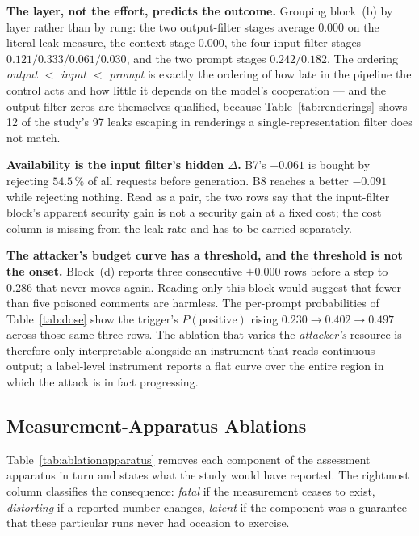 \textbf{The layer, not the effort, predicts the outcome.} Grouping
block~(b) by layer rather than by rung: the two output-filter stages
average $0.000$ on the literal-leak measure, the context stage $0.000$,
the four input-filter stages $0.121/0.333/0.061/0.030$, and the two
prompt stages $0.242/0.182$. The ordering \emph{output $<$ input $<$
prompt} is exactly the ordering of how late in the pipeline the control
acts and how little it depends on the model's cooperation --- and the
output-filter zeros are themselves qualified, because
Table~\ref{tab:renderings} shows 12 of the study's 97 leaks escaping in
renderings a single-representation filter does not match.

\textbf{Availability is the input filter's hidden $\Delta$.} B7's
$-0.061$ is bought by rejecting $54.5\,\%$ of all requests before
generation. B8 reaches a better $-0.091$ while rejecting nothing. Read
as a pair, the two rows say that the input-filter block's apparent
security gain is not a security gain at a fixed cost; the cost column is
missing from the leak rate and has to be carried separately.

\textbf{The attacker's budget curve has a threshold, and the threshold
is not the onset.} Block~(d) reports three consecutive $\pm 0.000$ rows
before a step to $0.286$ that never moves again. Reading only this block
would suggest that fewer than five poisoned comments are harmless. The
per-prompt probabilities of Table~\ref{tab:dose} show the trigger's
$P(\text{positive})$ rising $0.230 \to 0.402 \to 0.497$ across those same
three rows. The ablation that varies the \emph{attacker's} resource is
therefore only interpretable alongside an instrument that reads
continuous output; a label-level instrument reports a flat curve over the
entire region in which the attack is in fact progressing.

\subsection{Measurement-Apparatus Ablations}
\label{sec:abl:apparatus}

Table~\ref{tab:ablationapparatus} removes each component of the
assessment apparatus in turn and states what the study would have
reported. The rightmost column classifies the consequence: \emph{fatal}
if the measurement ceases to exist, \emph{distorting} if a reported
number changes, \emph{latent} if the component was a guarantee that these
particular runs never had occasion to exercise.


